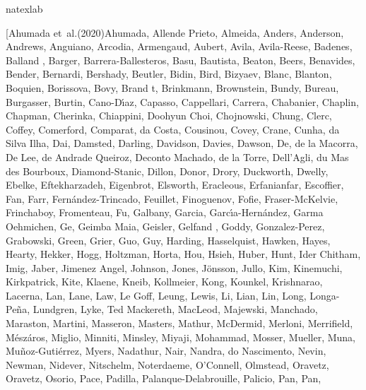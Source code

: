 \documentclass[longauth]{aa} %
\begin{document}
\begin{thebibliography}{112}
	\expandafter\ifx\csname natexlab\endcsname\relax\def\natexlab#1{#1}\fi
	
	\bibitem[{{Ahumada} {et~al.}(2020){Ahumada}, {Allende Prieto}, {Almeida},
		{Anders}, {Anderson}, {Andrews}, {Anguiano}, {Arcodia}, {Armengaud},
		{Aubert}, {Avila}, {Avila-Reese}, {Badenes}, {Balland }, {Barger},
		{Barrera-Ballesteros}, {Basu}, {Bautista}, {Beaton}, {Beers}, {Benavides},
		{Bender}, {Bernardi}, {Bershady}, {Beutler}, {Bidin}, {Bird}, {Bizyaev},
		{Blanc}, {Blanton}, {Boquien}, {Borissova}, {Bovy}, {Brand t}, {Brinkmann},
		{Brownstein}, {Bundy}, {Bureau}, {Burgasser}, {Burtin}, {Cano-D{\'\i}az},
		{Capasso}, {Cappellari}, {Carrera}, {Chabanier}, {Chaplin}, {Chapman},
		{Cherinka}, {Chiappini}, {Doohyun Choi}, {Chojnowski}, {Chung}, {Clerc},
		{Coffey}, {Comerford}, {Comparat}, {da Costa}, {Cousinou}, {Covey}, {Crane},
		{Cunha}, {da Silva Ilha}, {Dai}, {Damsted}, {Darling}, {Davidson}, {Davies},
		{Dawson}, {De}, {de la Macorra}, {De Lee}, {de Andrade Queiroz}, {Deconto
			Machado}, {de la Torre}, {Dell'Agli}, {du Mas des Bourboux},
		{Diamond-Stanic}, {Dillon}, {Donor}, {Drory}, {Duckworth}, {Dwelly},
		{Ebelke}, {Eftekharzadeh}, {Eigenbrot}, {Elsworth}, {Eracleous},
		{Erfanianfar}, {Escoffier}, {Fan}, {Farr}, {Fern{\'a}ndez-Trincado},
		{Feuillet}, {Finoguenov}, {Fofie}, {Fraser-McKelvie}, {Frinchaboy},
		{Fromenteau}, {Fu}, {Galbany}, {Garcia}, {Garc{\'\i}a-Hern{\'a}ndez}, {Garma
			Oehmichen}, {Ge}, {Geimba Maia}, {Geisler}, {Gelfand }, {Goddy},
		{Gonzalez-Perez}, {Grabowski}, {Green}, {Grier}, {Guo}, {Guy}, {Harding},
		{Hasselquist}, {Hawken}, {Hayes}, {Hearty}, {Hekker}, {Hogg}, {Holtzman},
		{Horta}, {Hou}, {Hsieh}, {Huber}, {Hunt}, {Ider Chitham}, {Imig}, {Jaber},
		{Jimenez Angel}, {Johnson}, {Jones}, {J{\"o}nsson}, {Jullo}, {Kim},
		{Kinemuchi}, {Kirkpatrick}, {Kite}, {Klaene}, {Kneib}, {Kollmeier}, {Kong},
		{Kounkel}, {Krishnarao}, {Lacerna}, {Lan}, {Lane}, {Law}, {Le Goff}, {Leung},
		{Lewis}, {Li}, {Lian}, {Lin}, {Long}, {Longa-Pe{\~n}a}, {Lundgren}, {Lyke},
		{Ted Mackereth}, {MacLeod}, {Majewski}, {Manchado}, {Maraston}, {Martini},
		{Masseron}, {Masters}, {Mathur}, {McDermid}, {Merloni}, {Merrifield},
		{M{\'e}sz{\'a}ros}, {Miglio}, {Minniti}, {Minsley}, {Miyaji}, {Mohammad},
		{Mosser}, {Mueller}, {Muna}, {Mu{\~n}oz-Guti{\'e}rrez}, {Myers}, {Nadathur},
		{Nair}, {Nandra}, {do Nascimento}, {Nevin}, {Newman}, {Nidever}, {Nitschelm},
		{Noterdaeme}, {O'Connell}, {Olmstead}, {Oravetz}, {Oravetz}, {Osorio},
		{Pace}, {Padilla}, {Palanque-Delabrouille}, {Palicio}, {Pan}, {Pan},
}
\end{thebibliography}
\end{document}

